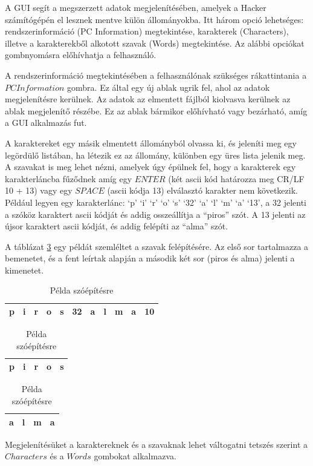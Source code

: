 \documentclass[12pt,a4paper,oneside]{report}
\begin{document}
A GUI segít a megszerzett adatok megjelenítésében, amelyek a Hacker számítógépén el lesznek mentve külön állományokba. Itt három opció lehetséges: rendszerinformáció (PC Information) megtekintése, karakterek (Characters), illetve a karakterekből alkotott szavak (Words) megtekintése. Az alábbi opciókat gombnyomásra előhívhatja a felhasználó.

A rendszerinformáció megtekintésében a felhasználónak szükséges rákattintania a $PC Information$ gombra. Ez által egy új ablak ugrik fel, ahol az adatok megjelenítésre kerülnek. Az adatok az elmentett fájlból kiolvasva kerülnek az ablak megjelenítő részébe. Ez az ablak bármikor előhívható vagy bezárható, amíg a GUI alkalmazás fut.

A karaktereket egy másik elmentett állományból olvassa ki, és jeleníti meg egy legördülő listában, ha létezik ez az állomány, különben egy üres lista jelenik meg. A szavakat is meg lehet nézni, amelyek úgy épülnek fel, hogy a karakterek egy karakterláncba fűződnek amíg egy $ENTER$ (két ascii kód határozza meg CR/LF 10 + 13) vagy egy $SPACE$ (ascii kódja 13) elválasztó karakter nem következik. Például legyen egy karakterlánc: `p' `i' `r' `o' `s' `32' `a' `l' `m' `a' `13', a 32 jelenti a szóköz karaktert ascii kódját és addig osszeállítja a ``piros'' szót. A 13 jelenti az újsor karaktert ascii kódját, és addig felépíti az ``alma'' szót.

A táblázat \ref{tab:karlanc} egy példát szemléltet a szavak felépítésére. Az első sor tartalmazza a bemenetet, és a fent leírtak alapján a második két sor (piros és alma) jelenti a kimenetet.
\begin{table}[H]
\caption{Példa szóépítésre}
\label{tab:karlanc}
\hspace{7em}
\begin{tabular}{|c|c|c|c|c|c|c|c|c|c|c|}
\hline
p&i&r&o&s&32&a&l&m&a&10\\
\hline
\end{tabular}
\vspace{5pt}

\hspace{7em}
\begin{tabular}{|c|c|c|c|c|}
\hline
p&i&r&o&s\\
\hline
\end{tabular}
\vspace{5pt}

\hspace{7em}
\begin{tabular}{|c|c|c|c|}
\hline
a&l&m&a\\
\hline
\end{tabular}
\end{table}
Megjelenítésüket a karaktereknek és a szavaknak lehet váltogatni tetszés szerint a $Characters$ és a $Words$ gombokat alkalmazva.
\end{document}

